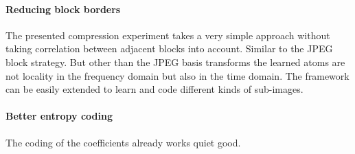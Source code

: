 \paragraph{Reducing block borders} The presented compression experiment
takes a very simple approach without taking correlation between adjacent
blocks into account. Similar to the JPEG block strategy. But other than
the JPEG basis transforms the learned atoms are not locality in the frequency
domain but also in the time domain. 
The framework can be easily extended to
learn and code different kinds of sub-images.

\paragraph{Better entropy coding}
The coding of the coefficients already works quiet good. 












